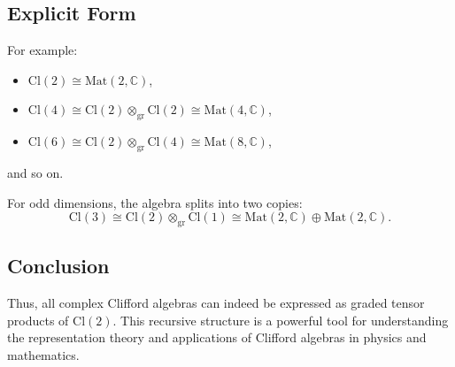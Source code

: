 \documentclass{article}
\begin{document}
\subsection*{Explicit Form}
For example:
\begin{itemize}
    \item \( \text{Cl}(2) \cong \text{Mat}(2, \mathbb{C}) \),
    \item \( \text{Cl}(4) \cong \text{Cl}(2) \otimes_{\text{gr}} \text{Cl}(2) \cong \text{Mat}(4, \mathbb{C}) \),
    \item \( \text{Cl}(6) \cong \text{Cl}(2) \otimes_{\text{gr}} \text{Cl}(4) \cong \text{Mat}(8, \mathbb{C}) \),
\end{itemize}
and so on.

For odd dimensions, the algebra splits into two copies:
\[
\text{Cl}(3) \cong \text{Cl}(2) \otimes_{\text{gr}} \text{Cl}(1) \cong \text{Mat}(2, \mathbb{C}) \oplus \text{Mat}(2, \mathbb{C}).
\]

\subsection*{Conclusion}
Thus, all complex Clifford algebras can indeed be expressed as graded tensor products of \( \text{Cl}(2) \). This recursive structure is a powerful tool for understanding the representation theory and applications of Clifford algebras in physics and mathematics.
\end{document}
